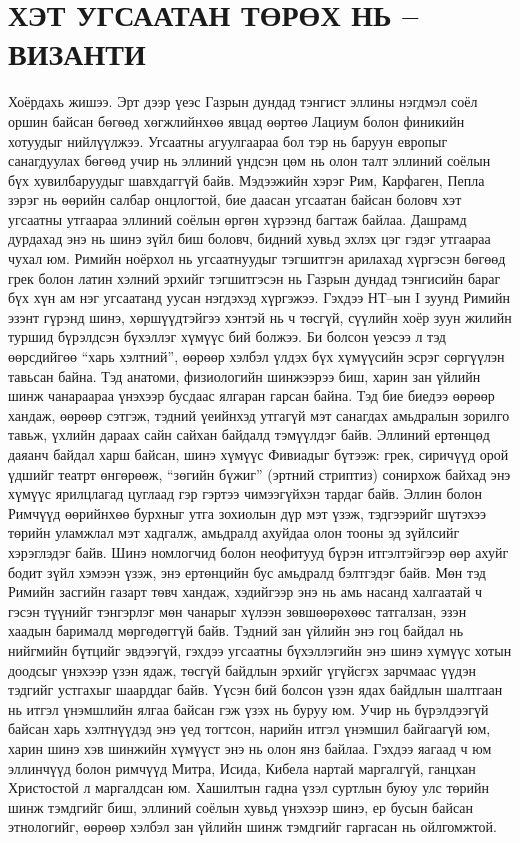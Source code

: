 \section{ХЭТ УГСААТАН ТӨРӨХ НЬ – ВИЗАНТИ}
Хоёрдахь жишээ. Эрт дээр үеэс Газрын дундад тэнгист эллины нэгдмэл соёл оршин байсан бөгөөд хөгжлийнхөө явцад өөртөө Лациум болон финикийн хотуудыг нийлүүлжээ. Угсаатны агуулгаараа бол тэр нь баруун европыг санагдуулах бөгөөд учир нь эллиний үндсэн цөм нь олон талт эллиний соёлын бүх хувилбаруудыг шавхдаггүй байв. Мэдээжийн хэрэг Рим, Карфаген, Пепла зэрэг нь өөрийн салбар онцлогтой, бие даасан угсаатан байсан боловч хэт угсаатны утгаараа эллиний соёлын өргөн хүрээнд багтаж байлаа. Дашрамд дурдахад энэ нь шинэ зүйл биш боловч, бидний хувьд эхлэх цэг гэдэг утгаараа чухал юм. Римийн ноёрхол нь угсаатнуудыг тэгшитгэн арилахад хүргэсэн бөгөөд грек болон латин хэлний эрхийг тэгшитгэсэн нь Газрын дундад тэнгисийн бараг бүх хүн ам нэг угсаатанд уусан нэгдэхэд хүргэжээ.
Гэхдээ НТ–ын I зуунд Римийн эзэнт гүрэнд шинэ, хөршүүдтэйгээ хэнтэй нь ч төсгүй, сүүлийн хоёр зуун жилийн туршид бүрэлдсэн бүхэллэг хүмүүс бий болжээ. Би болсон үеэсээ л тэд өөрсдийгөө “харь хэлтний”, өөрөөр хэлбэл үлдэх бүх хүмүүсийн эсрэг сөргүүлэн тавьсан байна. Тэд анатоми, физиологийн шинжээрээ биш, харин зан үйлийн шинж чанараараа үнэхээр бусдаас ялгаран гарсан байна. Тэд бие биедээ өөрөөр хандаж, өөрөөр сэтгэж, тэдний үеийнхэд утгагүй мэт санагдах амьдралын зорилго тавьж, үхлийн дараах сайн сайхан байдалд тэмүүлдэг байв. Эллиний ертөнцөд даяанч байдал харш байсан, шинэ хүмүүс Фивиадыг бүтээж: грек, сиричүүд орой үдшийг театрт өнгөрөөж, “зөгийн бүжиг” (эртний стриптиз) сонирхож байхад энэ хүмүүс ярилцлагад цуглаад гэр гэртээ чимээгүйхэн тардаг байв. Эллин болон Римчүүд өөрийнхөө бурхныг утга зохиолын дүр мэт үзэж, тэдгээрийг шүтэхээ төрийн уламжлал мэт хадгалж, амьдралд ахуйдаа олон тооны эд зүйлсийг хэрэглэдэг байв. Шинэ номлогчид болон неофитууд бүрэн итгэлтэйгээр өөр ахуйг бодит зүйл хэмээн үзэж, энэ ертөнцийн бус амьдралд бэлтгэдэг байв. Мөн тэд Римийн засгийн газарт төвч хандаж, хэдийгээр энэ нь амь насанд халгаатай ч гэсэн түүнийг тэнгэрлэг мөн чанарыг хүлээн зөвшөөрөхөөс татгалзан, эзэн хаадын барималд мөргөдөггүй байв. Тэдний зан үйлийн энэ гоц байдал нь нийгмийн бүтцийг эвдээгүй, гэхдээ угсаатны бүхэллэгийн энэ шинэ хүмүүс хотын доодсыг үнэхээр үзэн ядаж, төсгүй байдлын эрхийг үгүйсгэх зарчмаас үүдэн тэдгийг устгахыг шаарддаг байв.
Үүсэн бий болсон үзэн ядах байдлын шалтгаан нь итгэл үнэмшлийн ялгаа байсан гэж үзэх нь буруу юм. Учир нь бүрэлдээгүй байсан харь хэлтнүүдэд энэ үед тогтсон, нарийн итгэл үнэмшил байгаагүй юм, харин шинэ хэв шинжийн хүмүүст энэ нь олон янз байлаа. Гэхдээ яагаад ч юм эллинчүүд болон римчүүд Митра, Исида, Кибела нартай маргалгүй, ганцхан Христостой л маргалдсан юм. Хашилтын гадна үзэл суртлын буюу улс төрийн шинж тэмдгийг биш, эллиний соёлын хувьд үнэхээр шинэ, ер бусын байсан этнологийг, өөрөөр хэлбэл зан үйлийн шинж тэмдгийг гаргасан нь ойлгомжтой.
